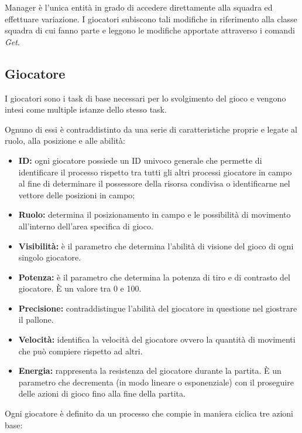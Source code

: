 \documentclass[aps,letterpaper,10pt]{article}
\begin{document}
Manager \`e l'unica entit\`a in grado di accedere direttamente alla squadra ed effettuare variazione. I giocatori
subiscono tali modifiche in riferimento alla classe squadra di cui fanno parte e leggono le modifiche apportate
attraverso i comandi \emph{Get}.

\subsection{Giocatore}
\label{giocatore}

I giocatori sono i task di base necessari per lo svolgimento del gioco e vengono intesi come multiple istanze dello
stesso task. \vspace{3mm}

Ognuno di essi \`e contraddistinto da una serie di caratteristiche proprie e legate al ruolo, alla posizione e alle
abilit\`a:

\begin{itemize}
\item \textbf{ID:} ogni giocatore possiede un ID univoco generale che permette di identificare il processo rispetto tra
tutti gli altri processi giocatore in campo al fine di determinare il possessore della risorsa condivisa o identificarne
nel vettore delle posizioni in campo;
\item \textbf{Ruolo:} determina il posizionamento in campo e le possibilit\`a di movimento all'interno dell'area
specifica di gioco.
\item \textbf{Visibilit\`a:} \`e il parametro che determina l'abilit\`a di visione del gioco di ogni singolo giocatore.\item \textbf{Potenza:} \`e il parametro che determina la potenza di tiro e di contrasto del giocatore. \`E un valore
tra 0 e 100.
	\item \textbf{Precisione:} contraddistingue l'abilit\`a del giocatore in questione nel giostrare il pallone.
\item \textbf{Velocit\`a:} identifica la velocit\`a del giocatore ovvero la quantit\`a di movimenti che pu\`o compiere
rispetto ad altri.
\item \textbf{Energia:} rappresenta la resistenza del giocatore durante la partita. \`E un parametro che decrementa (in
modo lineare o esponenziale) con il proseguire delle azioni di gioco fino alla fine della partita.
\end{itemize}

Ogni giocatore \`e definito da un processo che compie in maniera ciclica tre azioni base:
\end{document}
